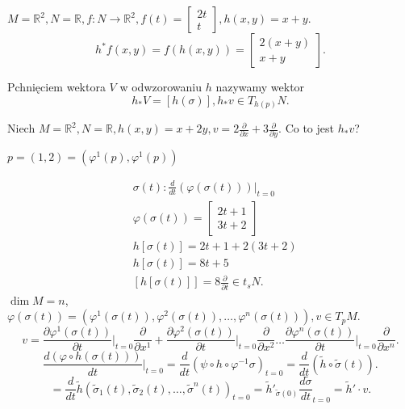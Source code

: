 \documentclass[../main.tex]{subfiles}
\begin{document}
\begin{przyklad}
    $M = \mathbb{R}^2, N = \mathbb{R}, f: N\to \mathbb{R}^2, f(t) = \begin{bmatrix} 2t\\t \end{bmatrix}, h(x,y) = x+y $.
    \[
        h^*f(x,y) = f(h(x,y)) = \begin{bmatrix} 2(x+y)\\x+y \end{bmatrix}
    .\]
\end{przyklad}
\begin{definicja}
    Pchnięciem wektora $V$ w odwzorowaniu $h$ nazywamy wektor
    \[
        h_* V = \left[ h(\sigma) \right], h_*v\in T_{h(p)}N
    .\]
\end{definicja}
\begin{przyklad}
    Niech $M = \mathbb{R}^2, N = \mathbb{R}, h(x,y) = x+2y, v = 2 \frac{\partial }{\partial x} + 3 \frac{\partial }{\partial y}$. Co to jest $h_*v$?

    $p = (1,2) = (\varphi^1(p),\varphi^1(p))$

    \begin{align*}
        &\sigma(t): \frac{d}{dt}(\varphi(\sigma(t)))\vert_{t=0}\\
        &\varphi(\sigma(t)) = \begin{bmatrix} 2t+1\\3t+2 \end{bmatrix}\\
        &h[\sigma(t)] = 2t+1 + 2(3t+2)\\
        &h[\sigma(t)] = 8t+5\\
        &\left[ h[\sigma(t)] \right] = 8 \frac{\partial }{\partial t} \in t_sN
    .\end{align*}
    $\dim M = n$, $\varphi(\sigma(t)) = \left( \varphi^1(\sigma(t)), \varphi^2(\sigma(t)),\ldots,\varphi^n(\sigma(t)) \right), v\in T_pM $.\\
    \[
        v = \frac{\partial \varphi^1(\sigma(t))}{\partial t} \vert_{t=0} \frac{\partial }{\partial x^1} + \frac{\partial \varphi^2(\sigma(t))}{\partial t} \vert_{t=0} \frac{\partial }{\partial x^2} \ldots \frac{\partial \varphi^n(\sigma(t))}{\partial t} \vert_{t=0} \frac{\partial }{\partial x^n}
    .\]
\[
    \frac{d(\varphi\circ h(\sigma(t)))}{dt}\vert_{t=0} = \frac{d}{dt}\left( \psi \circ h \circ \varphi^{-1} \sigma \right)_{t=0} = \frac{d}{dt}\left( \tilde h \circ \tilde \sigma(t) \right)
.\]
\[
    = \frac{d}{dt}\tilde h\left( \tilde \sigma_1(t), \tilde \sigma_2(t), \ldots, \tilde \sigma^n(t) \right)_{t=0} = \tilde h'_{\tilde \sigma(0)} \frac{d\tilde \sigma}{dt}_{t=0} = \tilde h'\cdot v
.\]


\end{przyklad}
\end{document}
